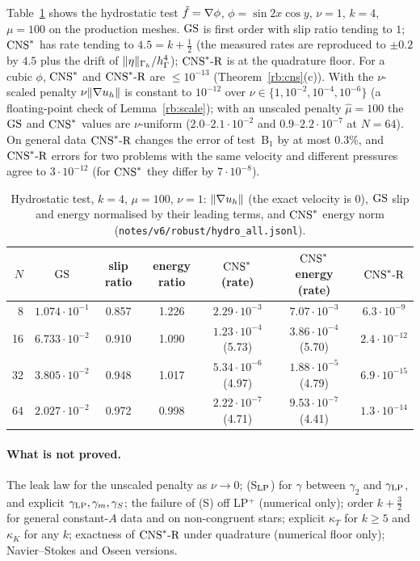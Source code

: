 Table~\ref{rb:tab} shows the hydrostatic test $\tilde f=\nabla\phi$, $\phi=\sin2x\cos y$, $\nu=1$, $k=4$, $\mu=100$ on the production meshes. $\mathrm{GS}$ is first order with slip ratio tending to $1$; $\mathrm{CNS}^\ast$ has rate tending to $4.5=k+\frac12$ (the measured rates are reproduced to $\pm0.2$ by $4.5$ plus the drift of $\lVert \eta\rVert_{\Gamma_h}/h_\Gamma^4$); $\mathrm{CNS}^\ast\text{-R}$ is at the quadrature floor. For a cubic $\phi$, $\mathrm{CNS}^\ast$ and $\mathrm{CNS}^\ast\text{-R}$ are $\le10^{-13}$ (Theorem~\ref{rb:cns}(c)). With the $\nu$-scaled penalty $\nu\lVert \nabla u_h\rVert$ is constant to $10^{-12}$ over $\nu\in\{1,10^{-2},10^{-4},10^{-6}\}$ (a floating-point check of Lemma~\ref{rb:scale}); with an unscaled penalty $\hat\mu=100$ the $\mathrm{GS}$ and $\mathrm{CNS}^\ast$ values are $\nu$-uniform ($2.0$--$2.1\cdot10^{-2}$ and $0.9$--$2.2\cdot10^{-7}$ at $N=64$). On general data $\mathrm{CNS}^\ast\text{-R}$ changes the error of test~B$_1$ by at most $0.3\%$, and $\mathrm{CNS}^\ast\text{-R}$ errors for two problems with the same velocity and different pressures agree to $3\cdot10^{-12}$ (for $\mathrm{CNS}^\ast$ they differ by $7\cdot10^{-8}$).

\begin{table}[t]
\centering\small
\caption{Hydrostatic test, $k=4$, $\mu=100$, $\nu=1$: $\lVert \nabla u_h\rVert$ (the exact velocity is $0$), $\mathrm{GS}$ slip and energy normalised by their leading terms, and $\mathrm{CNS}^\ast$ energy norm (\texttt{notes/v6/robust/hydro\_all.jsonl}).}\label{rb:tab}
\begin{tabular}{rcccccc}
\toprule
$N$ & $\mathrm{GS}$ & slip ratio & energy ratio & $\mathrm{CNS}^\ast$ (rate) & $\mathrm{CNS}^\ast$ energy (rate) & $\mathrm{CNS}^\ast\text{-R}$\\
\midrule
8 & $1.074\cdot10^{-1}$ & 0.857 & 1.226 & $2.29\cdot10^{-3}$ & $7.07\cdot10^{-3}$ & $6.3\cdot10^{-9}$\\
16 & $6.733\cdot10^{-2}$ & 0.910 & 1.090 & $1.23\cdot10^{-4}$ (5.73) & $3.86\cdot10^{-4}$ (5.70) & $2.4\cdot10^{-12}$\\
32 & $3.805\cdot10^{-2}$ & 0.948 & 1.017 & $5.34\cdot10^{-6}$ (4.97) & $1.88\cdot10^{-5}$ (4.79) & $6.9\cdot10^{-15}$\\
64 & $2.027\cdot10^{-2}$ & 0.972 & 0.998 & $2.22\cdot10^{-7}$ (4.71) & $9.53\cdot10^{-7}$ (4.41) & $1.3\cdot10^{-14}$\\
\bottomrule
\end{tabular}
\end{table}

\paragraph{What is not proved.} The leak law for the unscaled penalty as $\nu\to0$; (S$_{\rm LP}$) for $\gamma$ between $\gamma_2$ and $\gamma_{\rm LP}$, and explicit $\gamma_{\rm LP},\gamma_m,\gamma_S$; the failure of (S) off LP$^+$ (numerical only); order $k+\frac32$ for general constant-$A$ data and on non-congruent stars; explicit $\kappa_T$ for $k\ge5$ and $\kappa_K$ for any $k$; exactness of $\mathrm{CNS}^\ast\text{-R}$ under quadrature (numerical floor only); Navier--Stokes and Oseen versions.
